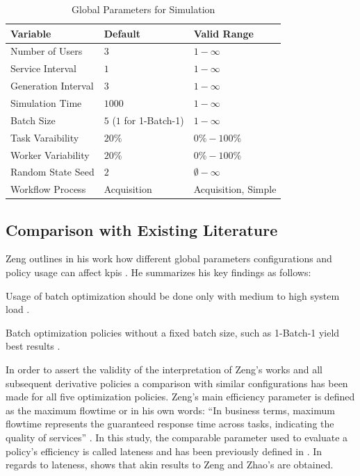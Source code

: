 \documentclass{seal_thesis}
\begin{document}
\begin{table}[!ht]
\centering
\begin{tabular}{@{}lll@{}}
\toprule
Variable            & Default     & Valid Range \\ \midrule
Number of Users     & $3$           & $1-\infty$      \\
Service Interval    & $1$           & $1-\infty$      \\
Generation Interval & $3$           & $1-\infty$      \\
Simulation Time     & $1000$          & $1-\infty$      \\
Batch Size          & $5$ ($1$ for 1-Batch-1)           & $1-\infty$      \\
Task Varaibility    & $20\%$        & $0\%-100\%$      \\
Worker Variability  & $20\%$        & $0\%-100\%$      \\
Random State Seed   & $2$           & $\emptyset-\infty$      \\
Workflow Process    & Acquisition & Acquisition, Simple      \\ \bottomrule
\end{tabular}
\caption{Global Parameters for Simulation}
\label{tab:global_parameters_sim}
\end{table}

\subsection{Comparison with Existing Literature}
\label{subsec:opt_comparison}

Zeng outlines in his work how different global parameters configurations and policy usage can affect \glspl{kpi} \cite[pp. 18-22]{Zeng2005}. He summarizes his key findings as follows:
\begin{enumerate*}
	\item Usage of batch optimization should be done only with medium to high system load \cite[p. 24]{Zeng2005}.
	\item Batch optimization policies without a fixed batch size, such as 1-Batch-1 yield best results \cite[p. 24]{Zeng2005}.
\end{enumerate*}

In order to assert the validity of the interpretation of Zeng's works and all subsequent derivative policies a comparison with similar configurations has been made for all five optimization policies. Zeng's main efficiency parameter is defined as the maximum flowtime or in his own words: ``In business terms, maximum flowtime represents the guaranteed response time across tasks, indicating the quality of services'' \cite[p. 17]{Zeng2005}. In this study, the comparable parameter used to evaluate a policy's efficiency is called lateness and has been previously defined in . In regards to lateness,  shows that akin results to Zeng and Zhao's are obtained.
\end{document}
